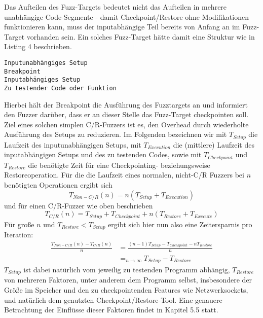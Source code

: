 \documentclass[a4paper]{article}
\begin{document}
Das Aufteilen des Fuzz-Targets bedeutet nicht das Aufteilen in mehrere unabhängige Code-Segmente - damit Checkpoint/Restore ohne Modifikationen funktionieren kann, muss der inputabhängige Teil bereits von Anfang an im Fuzz-Target vorhanden sein. 
Ein solches Fuzz-Target hätte damit eine Struktur wie in Listing 4 beschrieben.
\begin{lstlisting}[caption=Struktur C/R-Fuzzer-Fuzztarget]
Inputunabhängiges Setup
Breakpoint
Inputabhängiges Setup
Zu testender Code oder Funktion
\end{lstlisting}
Hierbei hält der Breakpoint die Ausführung des Fuzztargets an und informiert den Fuzzer darüber, dass er an dieser Stelle das Fuzz-Target checkpointen soll.\\
Ziel eines solchen simplen C/R-Fuzzers ist es, den Overhead durch wiederholte Ausführung des Setups zu reduzieren.
Im Folgenden bezeichnen wir mit $T_{Setup}$ die Laufzeit des inputunabhängigen Setups, mit $T_{Execution}$ die (mittlere) Laufzeit des inputabhängigen Setups und des zu testenden Codes, sowie mit $T_{Checkpoint}$ und $T_{Restore}$ die benötigte Zeit für eine Checkpointing- beziehungsweise Restoreoperation. 
Für die die Laufzeit eines normalen, nicht-C/R Fuzzers bei $n$ benötigten Operationen ergibt sich
\begin{equation}
    T_{Non-C/R}(n) = n (T_{Setup} + T_{Execution})
\end{equation}
und für einen C/R-Fuzzer wie oben beschrieben
\begin{equation}
    T_{C/R}(n) = T_{Setup} + T_{Checkpoint} + n (T_{Restore} + T_{Execute})
\end{equation}
Für große $n$ und $T_{Restore} < T_{Setup}$ ergibt sich hier nun also eine Zeitersparnis pro Iteration:
\begin{equation}
    \begin{split}
        \frac{T_{Non-C/R}(n) - T_{C/R}(n)}{n} &= \frac{(n-1) T_{Setup} - T_{Checkpoint} - n T_{Restore}}{n} \\
        &=_{n \to \infty} T_{Setup} - T_{Restore}
    \end{split}
\end{equation}
$T_{Setup}$ ist dabei natürlich vom jeweilig zu testenden Programm abhängig, $T_{Restore}$ von mehreren Faktoren, unter anderem dem Programm selbst, insbesondere der Größe im Speicher und den zu checkpointenden Features wie Netzwerksockets, und natürlich dem genutzten Checkpoint/Restore-Tool. Eine genauere Betrachtung der Einflüsse dieser Faktoren findet in Kapitel 5.5 statt.
\end{document}
